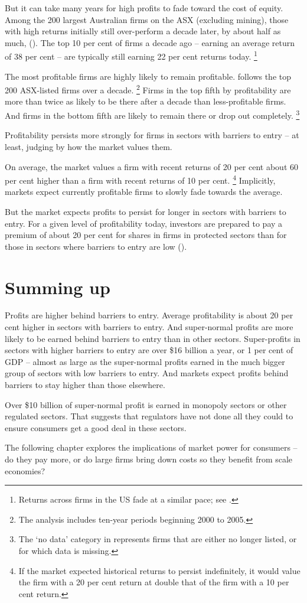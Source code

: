 But it can take many years for high profits to fade toward the cost of equity. Among the 200 largest Australian firms on the ASX (excluding mining), those with high returns initially still over-perform a decade later, by about half as much,  (). The top 10 per cent of firms a decade ago -- earning an average return of 38 per cent -- are typically still earning 22 per cent returns today.%
    \footnote{Returns across firms in the US fade at a similar pace; see \textcite{Koller_ROIC_2010}.}

The most profitable firms are highly likely to remain profitable.
 follows the top 200 ASX-listed firms over a decade.%
    \footnote{The analysis includes ten-year periods beginning 2000 to 2005.}
Firms in the top fifth by profitability are more than twice as likely to be there after a decade than less-profitable firms. And firms in the bottom fifth are likely to remain there or drop out completely.%
    \footnote{The `no data' category in  represents firms that are either no longer listed, or for which data is missing.}

Profitability persists more strongly for firms in sectors with barriers to entry -- at least, judging by how the market values them.

On average, the market values a firm with recent returns of 20 per cent about 60 per cent higher than a firm with recent returns of 10 per cent.%
    \footnote{If the market expected historical returns to persist indefinitely, it would value the firm with a 20 per cent return at double that of the firm with a 10 per cent return.}
Implicitly, markets expect currently profitable firms to slowly fade towards the average.

But the market expects profits to persist for longer in sectors with barriers to entry.
For a given level of profitability today, investors are prepared to pay a premium of about 20 per cent for shares in firms in protected sectors than for those in sectors where barriers to entry are low (). 

\section{Summing up}

Profits are higher behind barriers to entry. Average profitability is about 20 per cent higher in sectors with barriers to entry. And super-normal profits are more likely to be earned behind barriers to entry than in other sectors.
Super-profits in sectors with higher barriers to entry are over \$16 billion a year, or 1 per cent of GDP -- almost as large as the super-normal profits earned in the much bigger group of sectors with low barriers to entry. And markets expect profits behind barriers to stay higher than those elsewhere.

Over \$10 billion of super-normal profit is earned in monopoly sectors or other regulated sectors. That suggests that regulators have not done all they could to ensure consumers get a good deal in these sectors. 

The following chapter explores the implications of market power for consumers -- do they pay more, or do large firms bring down costs so they benefit from scale economies?

